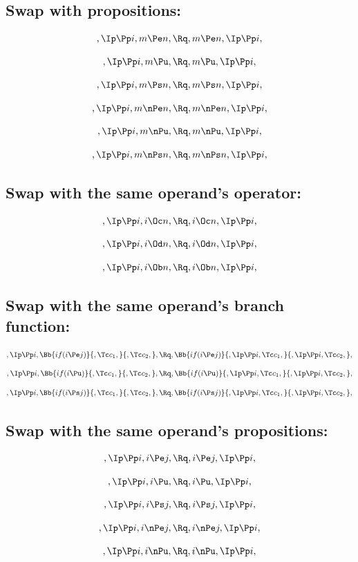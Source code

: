 \bigskip
\bigskip
\subsection{Swap with propositions:}
\[,\Ip \Pp i, m \Pe n, \Rq , m \Pe n, \Ip \Pp i,\]

\[,\Ip \Pp i, m \Pu, \Rq , m \Pu, \Ip \Pp i,\]

\[,\Ip \Pp i, m \Ps n, \Rq , m \Ps n, \Ip \Pp i,\]

\[,\Ip \Pp i, m \nPe n, \Rq , m \nPe n, \Ip \Pp i,\]

\[,\Ip \Pp i, m \nPu, \Rq , m \nPu, \Ip \Pp i,\]

\[,\Ip \Pp i, m \nPs n, \Rq , m \nPs n, \Ip \Pp i,\]


\bigskip
\bigskip
\subsection{Swap with the same operand's operator:}
\[,\Ip \Pp i, i \Oc n, \Rq , i \Oc n, \Ip \Pp i,\]

\[,\Ip \Pp i, i \Od n, \Rq , i \Od n, \Ip \Pp i,\]

\[,\Ip \Pp i, i \Ob n, \Rq , i \Ob n, \Ip \Pp i,\]


\bigskip
\bigskip
\subsection{Swap with the same operand's  branch function:}
\[,\Ip \Pp i, \Bb{if(i \Pe j)}{,\Tc c_1,}{,\Tc c_2,}, \Rq , \Bb{if(i \Pe j)}{,\Ip \Pp i, \Tc c_1,}{,\Ip \Pp i, \Tc c_2,},\]
\bigskip
\bigskip
\[,\Ip \Pp i, \Bb{if(i \Pu)}{,\Tc c_1,}{,\Tc c_2,}, \Rq , \Bb{if(i \Pu)}{,\Ip \Pp i, \Tc c_1,}{,\Ip \Pp i, \Tc c_2,},\]
\bigskip
\bigskip
\[,\Ip \Pp i, \Bb{if(i \Ps j)}{,\Tc c_1,}{,\Tc c_2,}, \Rq , \Bb{if(i \Ps j)}{,\Ip \Pp i, \Tc c_1,}{,\Ip \Pp i, \Tc c_2,},\]


\bigskip
\bigskip
\subsection{Swap with the same operand's propositions:}
\[,\Ip \Pp i, i \Pe j, \Rq , i \Pe j, \Ip \Pp i,\]

\[,\Ip \Pp i, i \Pu, \Rq , i \Pu, \Ip \Pp i,\]

\[,\Ip \Pp i, i \Ps j, \Rq , i \Ps j, \Ip \Pp i,\]

\[,\Ip \Pp i, i \nPe j, \Rq , i \nPe j, \Ip \Pp i,\]

\[,\Ip \Pp i, i \nPu, \Rq , i \nPu, \Ip \Pp i,\]

